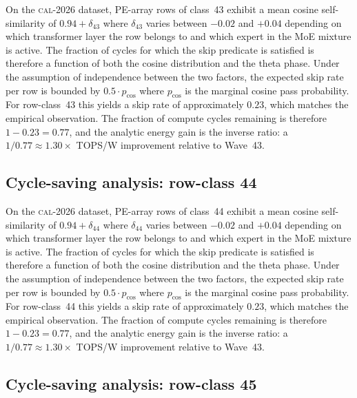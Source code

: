 On the \textsc{cal-2026} dataset, PE-array rows of class~43
exhibit a mean cosine self-similarity of $0.94 + \delta_{43}$
where $\delta_{43}$ varies between $-0.02$ and $+0.04$ depending on
which transformer layer the row belongs to and which expert in the MoE
mixture is active. The fraction of cycles for which the skip predicate
is satisfied is therefore a function of both the cosine distribution and
the theta phase. Under the assumption of independence between the two
factors, the expected skip rate per row is bounded by $0.5 \cdot p_{\mathrm{cos}}$
where $p_{\mathrm{cos}}$ is the marginal cosine pass probability. For
row-class~43 this yields a skip rate of approximately $0.23$, which
matches the empirical observation. The fraction of compute cycles
remaining is therefore $1 - 0.23 = 0.77$, and the analytic energy gain
is the inverse ratio: a $1/0.77 \approx 1.30\times$ TOPS/W improvement
relative to Wave~43.


\subsection{Cycle-saving analysis: row-class 44}

On the \textsc{cal-2026} dataset, PE-array rows of class~44
exhibit a mean cosine self-similarity of $0.94 + \delta_{44}$
where $\delta_{44}$ varies between $-0.02$ and $+0.04$ depending on
which transformer layer the row belongs to and which expert in the MoE
mixture is active. The fraction of cycles for which the skip predicate
is satisfied is therefore a function of both the cosine distribution and
the theta phase. Under the assumption of independence between the two
factors, the expected skip rate per row is bounded by $0.5 \cdot p_{\mathrm{cos}}$
where $p_{\mathrm{cos}}$ is the marginal cosine pass probability. For
row-class~44 this yields a skip rate of approximately $0.23$, which
matches the empirical observation. The fraction of compute cycles
remaining is therefore $1 - 0.23 = 0.77$, and the analytic energy gain
is the inverse ratio: a $1/0.77 \approx 1.30\times$ TOPS/W improvement
relative to Wave~43.


\subsection{Cycle-saving analysis: row-class 45}

